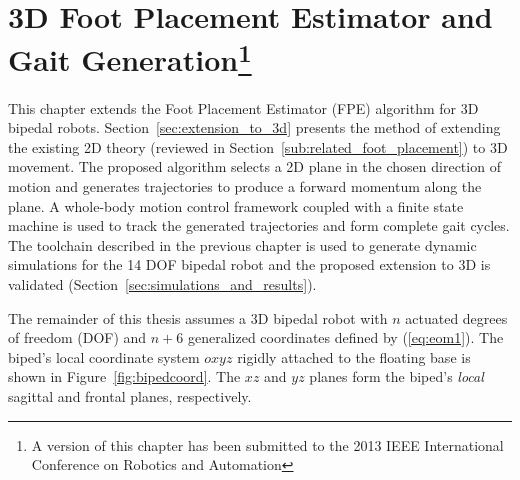\chapter[3D Foot Placement Estimator and Gait Generation]{3D Foot Placement Estimator and Gait Generation\footnote{A version of this chapter has been submitted to the 2013 IEEE International Conference on Robotics and Automation}} %
\label{cha:simulations}

This chapter extends the Foot Placement Estimator (FPE) algorithm for 3D bipedal robots. Section~\ref{sec:extension_to_3d} presents the method of extending the existing 2D theory (reviewed in Section~\ref{sub:related_foot_placement}) to 3D movement. The proposed algorithm selects a 2D plane in the chosen direction of motion and generates trajectories to produce a forward momentum along the plane. A whole-body motion control framework coupled with a finite state machine is used to track the generated trajectories and form complete gait cycles. The toolchain described in the previous chapter is used to generate dynamic simulations for the 14 DOF bipedal robot and the proposed extension to 3D is validated (Section~\ref{sec:simulations_and_results}).

The remainder of this thesis assumes a 3D bipedal robot with $n$ actuated degrees of freedom (DOF) and $n+6$ generalized coordinates defined by (\ref{eq:eom1}). The biped's local coordinate system $oxyz$ rigidly attached to the floating base is shown in Figure~\ref{fig:bipedcoord}. The $xz$ and $yz$ planes form the biped's \emph{local} sagittal and frontal planes, respectively. 

